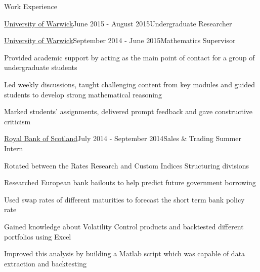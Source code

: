 \documentclass{resume} %
\begin{document}
\begin{rSection}{Work Experience}
\begin{rSubsection}{\href{https://warwick.ac.uk/fac/sci/maths/}{University of Warwick}}{June 2015 - August 2015}{Undergraduate Researcher}{}
\end{rSubsection}

\begin{rSubsection}{\href{https://warwick.ac.uk/fac/sci/maths/}{University of Warwick}}{September 2014 - June 2015}{Mathematics Supervisor}{}
\item Provided academic support by acting as the main point of contact for a group of undergraduate students
\item Led weekly discussions, taught challenging content from key modules and guided students to develop strong mathematical reasoning
\item Marked students' assignments, delivered prompt feedback and gave constructive criticism

\end{rSubsection}

\begin{rSubsection}{\href{https://www.natwestmarkets.com/}{Royal Bank of Scotland}}{July 2014 - September 2014}{Sales \& Trading Summer Intern}{}
\item Rotated between the Rates Research and Custom Indices Structuring divisions
\item Researched European bank bailouts to help predict future government borrowing
\item Used swap rates of different maturities to forecast the short term bank policy rate
\item Gained knowledge about Volatility Control products and backtested different portfolios using Excel
\item Improved this analysis by building a Matlab script which was capable of data extraction and backtesting
\end{rSubsection}
\fi

\iffalse
\begin{rSubsection}{Tao Applications}{June 2013 - Current}{Android Application Developer}{}
\item Worked with a partner on developing applications such as a poker and speedometer
\item Widened my understanding about programming 
\end{rSubsection}

\fi


\end{rSection}
\end{document}
